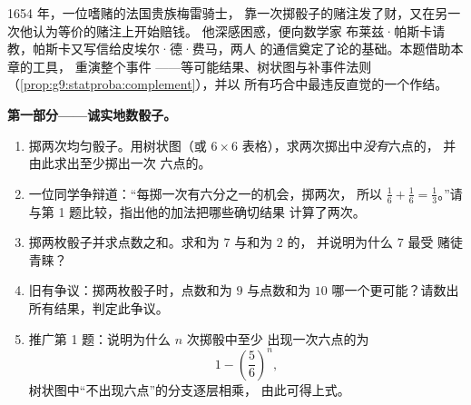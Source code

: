 \begin{problem}
\label{pb:g9:statproba:1}
1654 年，一位嗜赌的法国贵族梅雷骑士，
靠一次掷骰子的赌注发了财，又在另一次他认为等价的赌注上开始赔钱。
他深感困惑，便向数学家
布莱兹·帕斯卡请教，帕斯卡又写信给皮埃尔·德·费马，两人
的通信奠定了论的基础。本题借助本章的工具，
重演整个事件
——等可能结果、树状图与补事件法则
（\cref{prop:g9:statproba:complement}），并以
所有巧合中最违反直觉的一个作结。

\medskip
\noindent\textbf{第一部分——诚实地数骰子。}
\begin{enumerate}
  \item 掷两次均匀骰子。用树状图（或 $6 \times 6$
        表格），求两次掷出中\emph{没有}六点的，
        并由此求出至少掷出一次
        六点的。
  \item 一位同学争辩道：“每掷一次有六分之一的机会，掷两次，
        所以 $\frac16 + \frac16 = \frac13$。”请与第
        1 题比较，指出他的加法把哪些确切结果
        计算了两次。
  \item 掷两枚骰子并求点数之和。求和为 $7$ 与和为 $2$ 的，
        并说明为什么 $7$ 最受
        赌徒青睐？
  \item 旧有争议：掷两枚骰子时，点数和为 $9$ 与点数和为
        $10$ 哪一个更可能？请数出所有结果，判定此争议。
  \item 推广第 1 题：说明为什么 $n$ 次掷骰中至少
        出现一次六点的为
        \[
        1 - \left(\frac56\right)^{\!n} ,
        \]
        树状图中“不出现六点”的分支逐层相乘，
        由此可得上式。
\end{enumerate}


\end{problem}
